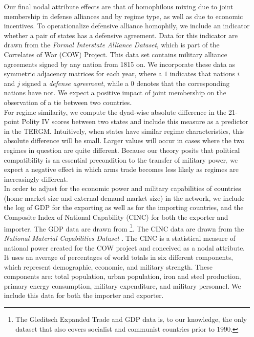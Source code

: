\documentclass[12pt, letterpaper]{article}
\numberwithin{equation}{section}
\begin{document}
Our final nodal attribute effects are that of homophilous mixing due to joint membership in defense alliances and by regime type, as well as due to economic incentives.
To operationalize defensive alliance homophily, we include an indicator whether a pair of states has a defensive agreement. 
Data for this indicator are drawn from the \emph{Formal Interstate Alliance Dataset}, which is part of the Correlates of War (COW) Project. This data set contains military alliance agreements signed by any nation from 1815 on. We incorporate these data as symmetric adjacency matrices for each year, where a $1$ indicates that nations $i$ and $j$ signed a \textit{defense agreement}, while a $0$ denotes that the corresponding nations have not. We expect a positive impact of joint membership on the observation of a tie between two countries.\\
For regime similarity, we compute the dyad-wise absolute difference in the 21-point Polity IV scores \citep{Mars2014} between two states and include this measure as a predictor in the TERGM. 
Intuitively, when states have similar regime characteristics, this absolute difference will be small. Larger values will occur in cases where the two regimes in question are quite different. Because our theory posits that political compatibility is an essential precondition to the transfer of military power, we expect a negative effect in which arms trade becomes less likely as regimes are increasingly different.\\
\indent In order to adjust for the economic power and military capabilities of countries (home market size and external demand market size) in the network, we include the log of GDP for the exporting as well as for the importing countries, and the Composite Index of National Capability (CINC) for both the exporter and importer. 
The GDP data are drawn from \cite{Gleditsch:2002}\footnote{The Gleditsch Expanded Trade and GDP data is, to our knowledge, the only dataset that also covers socialist and communist countries prior to 1990.}.
The CINC data are drawn from the \textit{National Material Capabilities Dataset} \citep{Singer1972}. 
The CINC is a statistical measure of national power created for the COW project and conceived as a nodal attribute. It uses an average of percentages of world totals in six different components, which represent demographic, economic, and military strength. These components are: total population, urban population, iron and steel production, primary energy consumption, military expenditure, and military personnel. 
We include this data for both the importer and exporter. 
\end{document}
